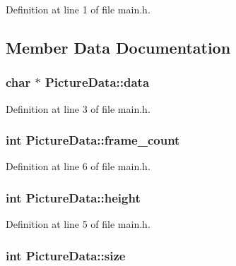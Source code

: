 Definition at line 1 of file main.\-h.



\subsection{Member Data Documentation}
\hypertarget{structPictureData_a2c18429fe90e5d541966cff885c56b16}{
\subsubsection[{data}]{\setlength{\rightskip}{0pt plus 5cm}char $\ast$ Picture\-Data\-::data}}\label{structPictureData_a2c18429fe90e5d541966cff885c56b16}


Definition at line 3 of file main.\-h.

\hypertarget{structPictureData_a0ece02dd11b74f6ddd9e9d68132c4c70}{
\subsubsection[{frame\-\_\-count}]{\setlength{\rightskip}{0pt plus 5cm}int Picture\-Data\-::frame\-\_\-count}}\label{structPictureData_a0ece02dd11b74f6ddd9e9d68132c4c70}


Definition at line 6 of file main.\-h.

\hypertarget{structPictureData_ab0565ab5f2e7291c0b23982b1a25b2a7}{
\subsubsection[{height}]{\setlength{\rightskip}{0pt plus 5cm}int Picture\-Data\-::height}}\label{structPictureData_ab0565ab5f2e7291c0b23982b1a25b2a7}


Definition at line 5 of file main.\-h.

\hypertarget{structPictureData_a2ca38938c35e5e26f27ea7089e8a394e}{
\subsubsection[{size}]{\setlength{\rightskip}{0pt plus 5cm}int Picture\-Data\-::size}}\label{structPictureData_a2ca38938c35e5e26f27ea7089e8a394e}


